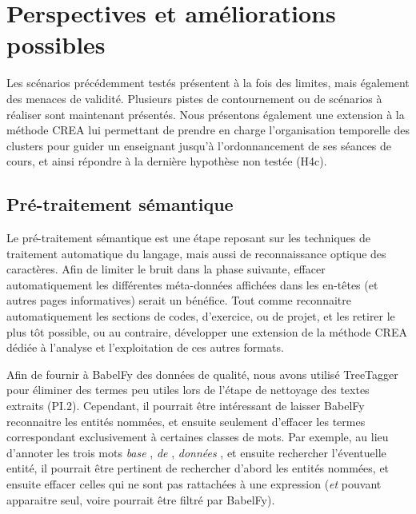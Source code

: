 \section{Perspectives et améliorations possibles}
\label{section:Conclusion:PerspectivesAmeliorations}

Les scénarios précédemment testés présentent à la fois des limites, mais également des menaces de validité.
Plusieurs pistes de contournement ou de scénarios à réaliser sont maintenant présentés.
Nous présentons également une extension à la méthode CREA lui permettant de prendre en charge l'organisation temporelle des clusters pour guider un enseignant jusqu'à l'ordonnancement de ses séances de cours, et ainsi répondre à la dernière hypothèse non testée (H4c).


\subsection{Pré-traitement sémantique}
\label{subsection:Conclusion:PerspectivesAmeliorations:PreTraitementSemantique}

Le pré-traitement sémantique est une étape reposant sur les techniques de traitement automatique du langage, mais aussi de reconnaissance optique des caractères.
Afin de limiter le bruit dans la phase suivante, effacer automatiquement les différentes méta-données affichées dans les en-têtes (et autres pages informatives) serait un bénéfice.
Tout comme reconnaitre automatiquement les sections de codes, d'exercice, ou de projet, et les retirer le plus tôt possible, ou au contraire, développer une extension de la méthode CREA dédiée à l'analyse et l'exploitation de ces autres formats.

\bigskip

Afin de fournir à BabelFy des données de qualité, nous avons utilisé TreeTagger pour éliminer des termes peu utiles lors de l'étape de nettoyage des textes extraits (PI.2).
Cependant, il pourrait être intéressant de laisser BabelFy reconnaitre les entités nommées, et ensuite seulement d'effacer les termes correspondant exclusivement à certaines classes de mots.
Par exemple, au lieu d'annoter les trois mots \og \textit{base} \fg, \og \textit{de} \fg, \og \textit{données} \fg, et ensuite rechercher l'éventuelle entité, il pourrait être pertinent de rechercher d'abord les entités nommées, et ensuite effacer celles qui ne sont pas rattachées à une expression (\og \textit{et} \fg pouvant apparaitre seul, voire pourrait être filtré par BabelFy).


